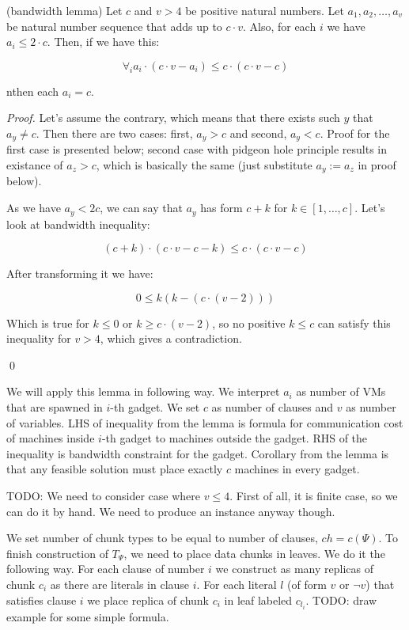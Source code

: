 \begin{lemma} (bandwidth lemma)
  Let $c$ and $v > 4$ be positive natural numbers. Let $a_1, a_2, \ldots,
  a_v$ be natural number sequence that adds up to $c \cdot v$. Also, for
  each $i$ we have $a_i \leq 2 \cdot c$. Then, if we have this:

  $$ \forall_i a_i \cdot (c \cdot v - a_i) \leq c \cdot (c \cdot v -
  c) $$

  nthen each $a_i = c$.
\end{lemma}
\begin{proof}

Let's assume the contrary, which means that there exists such $y$ that
$a_y \neq c$. Then there are two cases: first, $a_y>c$ and second,
$a_y<c$. Proof for the first case is presented below; second case
with pidgeon hole principle results in existance of $a_z > c$, which
is basically the same (just substitute $a_y := a_z$ in proof below).

As we have $a_y < 2c$, we can say that $a_y$ has form $c +
k$ for $k \in [1, \ldots, c]$. Let's look at bandwidth inequality:

$$ (c + k) \cdot (c \cdot v - c - k) \leq c \cdot (c \cdot v - c) $$

After transforming it we have:

$$ 0 \leq k(k - (c \cdot (v - 2))) $$

Which is true for $k \leq 0$ or $k \geq c \cdot (v - 2)$, so no
positive $k \leq c$ can satisfy this inequality for $v > 4$, which gives a contradiction. 

\qed

\end{proof}

We will apply this lemma in following way. We interpret $a_i$ as
number of VMs that are spawned in $i$-th gadget. We set $c$ as number
of clauses and $v$ as number of variables. LHS of inequality from the
lemma is formula for communication cost of machines inside $i$-th
gadget to machines outside the gadget. RHS of the inequality is
bandwidth constraint for the gadget. Corollary from the lemma is that
any feasible solution must place exactly $c$ machines in every gadget.

TODO: We need to consider case where $v \leq 4$. First of all, it is
finite case, so we can do it by hand. We need to
produce an instance anyway though.

We set number of chunk types to be equal to number of clauses, $ch =
c(\Psi)$. To finish construction of $T_{\Psi}$, we need to place data chunks in
leaves. We do it the following way. For each clause of number $i$ we
construct as many replicas of chunk $c_i$ as there are literals in
clause $i$. For each literal $l$ (of form $v$ or $\neg v$) that satisfies clause $i$ we place
replica of chunk $c_i$ in leaf labeled $c_{l_i}$. TODO: draw example for
some simple formula.

